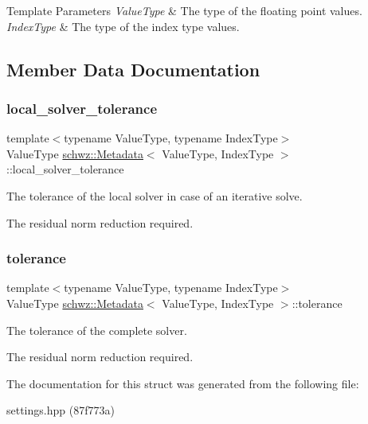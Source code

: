 \begin{DoxyTemplParams}{Template Parameters}
{\em Value\+Type} & The type of the floating point values. \\
\hline
{\em Index\+Type} & The type of the index type values. \\
\hline
\end{DoxyTemplParams}


\subsection{Member Data Documentation}
\mbox{\label{structschwz_1_1Metadata_a0fec5924fa99f07cabf560cc461887b5}} 
\subsubsection{\texorpdfstring{local\+\_\+solver\+\_\+tolerance}{local\_solver\_tolerance}}
{\footnotesize\ttfamily template$<$typename Value\+Type, typename Index\+Type$>$ \\
Value\+Type \hyperlink{structschwz_1_1Metadata}{schwz\+::\+Metadata}$<$ Value\+Type, Index\+Type $>$\+::local\+\_\+solver\+\_\+tolerance}



The tolerance of the local solver in case of an iterative solve. 

The residual norm reduction required. \mbox{\label{structschwz_1_1Metadata_a366db94e2a75dbdd82616e0d0b33bb86}} 
\subsubsection{\texorpdfstring{tolerance}{tolerance}}
{\footnotesize\ttfamily template$<$typename Value\+Type, typename Index\+Type$>$ \\
Value\+Type \hyperlink{structschwz_1_1Metadata}{schwz\+::\+Metadata}$<$ Value\+Type, Index\+Type $>$\+::tolerance}



The tolerance of the complete solver. 

The residual norm reduction required. 

The documentation for this struct was generated from the following file\+:\begin{DoxyCompactItemize}
\item 
settings.\+hpp (87f773a)\end{DoxyCompactItemize}
